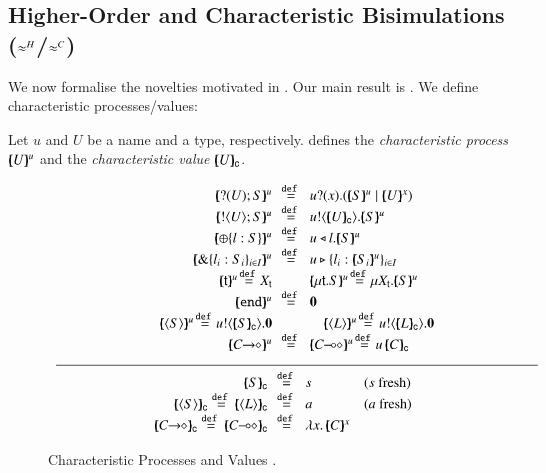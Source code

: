 \subsection{Higher-Order  and  
Characteristic  Bisimulations ($\approx^H$/$\approx^C$)}\label{ss:hwb}
\noi 
We now formalise the novelties motivated in .
Our main result is .
We define characteristic processes/values:

\begin{definition}\rm
\label{def:char}
	Let $u$ and $U$ be a name and a type, respectively.
	 defines the {\em characteristic process} 
	$[\!\!(U)\!\!]^{u}$ and the {\em characteristic value} $[\!\!(U)\!\!]_{\mathsf{c}}$.
\end{definition}

\smallskip

\begin{figure}[t]
	\[
	\begin{array}{c}
		\begin{array}{rclcl}
			\mapchar{\btinp{U} S}{u} &\!\!\defeq\!\!
& \binp{u}{x} (\mapchar{S}{u} \Par \mapchar{U}{x})
			\\
			\mapchar{\btout{U} S}{u} &\!\!\defeq\!\!& \bout{u}{\omapchar{U}} \mapchar{S}{u} %
			\\
			\mapchar{\btsel{l : S}}{u} &\!\!\defeq\!\!& \bsel{u}{l} \mapchar{S}{u}
			\\
			\mapchar{\btbra{l_i: S_i}_{i \in I}}{u} &\!\!\defeq\!\!& \bbra{u}{l_i: \mapchar{S_i}{u}}_{i \in I}
			\\
		\mapchar{\tvar{t}}{u} \!\defeq\! \varp{X}_{\vart{t}}
& & 
			\mapchar{\trec{t}{S}}{u} \!\defeq\! \recp{X_{\vart{t}}}{\mapchar{S}{u}}
			\\
			\mapchar{\tinact}{u} &\!\!\defeq\!\!& \inact
			\\
\mapchar{\chtype{S}}{u} \!\defeq\! \bout{u}{\omapchar{S}} \inact & & 
\quad\mapchar{\chtype{L}}{u} \!\defeq\! \bout{u}{\omapchar{L}} \inact
			\\
\mapchar{\shot{C}}{u} & \!\!\defeq\!\! & \mapchar{\lhot{C}}{u} \!\defeq\! 
\appl{u}{\omapchar{C}}
\end{array}
\\
\Hline
\\
		\begin{array}{rcll}
\omapchar{S} &\!\!\defeq\!\!& s & (s \textrm{ fresh})
			\\
\omapchar{\chtype{S}} \defeq \omapchar{\chtype{L}} &\!\!\defeq\!\!& a & 
(a \textrm{ fresh})\quad\quad
			\\
			\omapchar{\shot{C}} \defeq \omapchar{\lhot{C}} &\!\!\defeq\!\!& \abs{x}{\mapchar{C}{x}}
		\end{array}
	\end{array}
	\]
\caption{Characteristic Processes  and Values .\label{fig:char}}
\Hlinefig
\end{figure}

